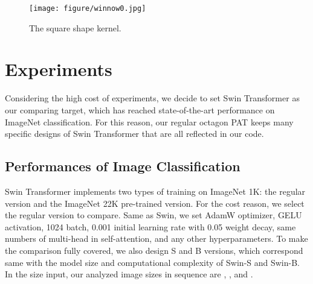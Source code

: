 \documentclass{article}
\theoremstyle{plain}
\theoremstyle{definition}
\theoremstyle{remark}
\begin{document}
\begin{figure}[h]
\centering
    \texttt{[image: figure/winnow0.jpg]}
\caption{The square shape kernel.}
\label{fig:winnow0}
\end{figure}


\section{Experiments}
Considering the high cost of experiments, we decide to set Swin Transformer as our comparing target, which has reached state-of-the-art performance on ImageNet classification. For this reason, our regular octagon PAT keeps many specific designs of Swin Transformer that are all reflected in our code.
\subsection{Performances of Image Classification}
Swin Transformer implements two types of training on ImageNet 1K: the regular version and the ImageNet 22K pre-trained version. For the cost reason, we select the regular version to compare. Same as Swin, we set AdamW optimizer, GELU activation, 1024 batch, 0.001 initial learning rate with 0.05 weight decay, same numbers of multi-head in self-attention, and any other hyperparameters. To make the comparison fully covered, we also design S and B versions, which correspond same with the model size and computational complexity of Swin-S and Swin-B. In the  size input, our analyzed image sizes in sequence are , , and .
\end{document}
